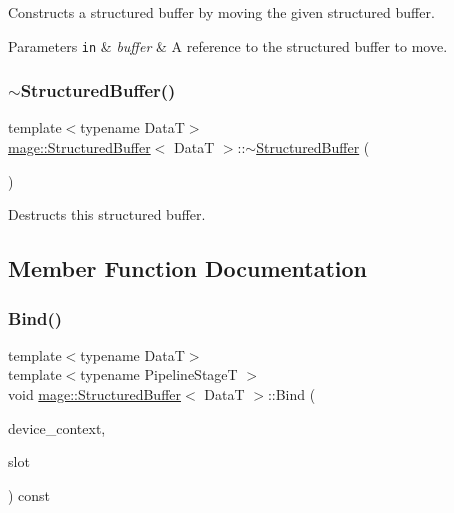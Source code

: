 Constructs a structured buffer by moving the given structured buffer.


\begin{DoxyParams}[1]{Parameters}
\mbox{\tt in}  & {\em buffer} & A reference to the structured buffer to move. \\
\hline
\end{DoxyParams}
\hypertarget{structmage_1_1_structured_buffer_a02ab1d322e1aef0c608b85224b80dbcf}{}\label{structmage_1_1_structured_buffer_a02ab1d322e1aef0c608b85224b80dbcf} 
\subsubsection{\texorpdfstring{$\sim$\+Structured\+Buffer()}{~StructuredBuffer()}}
{\footnotesize\ttfamily template$<$typename DataT$>$ \\
\hyperlink{structmage_1_1_structured_buffer}{mage\+::\+Structured\+Buffer}$<$ DataT $>$\+::$\sim$\hyperlink{structmage_1_1_structured_buffer}{Structured\+Buffer} (\begin{DoxyParamCaption}{ }\end{DoxyParamCaption})\hspace{0.3cm}{\ttfamily [default]}}

Destructs this structured buffer. 

\subsection{Member Function Documentation}
\hypertarget{structmage_1_1_structured_buffer_ae3884b12cbf30188089481b39fefa4c2}{}\label{structmage_1_1_structured_buffer_ae3884b12cbf30188089481b39fefa4c2} 
\subsubsection{\texorpdfstring{Bind()}{Bind()}}
{\footnotesize\ttfamily template$<$typename DataT$>$ \\
template$<$typename Pipeline\+StageT $>$ \\
void \hyperlink{structmage_1_1_structured_buffer}{mage\+::\+Structured\+Buffer}$<$ DataT $>$\+::Bind (\begin{DoxyParamCaption}\item[{I\+D3\+D11\+Device\+Context4 $\ast$}]{device\+\_\+context,  }\item[{\hyperlink{namespacemage_a41c104c036fba3756a74e19f793eeaa1}{U32}}]{slot }\end{DoxyParamCaption}) const\hspace{0.3cm}{\ttfamily [noexcept]}}

